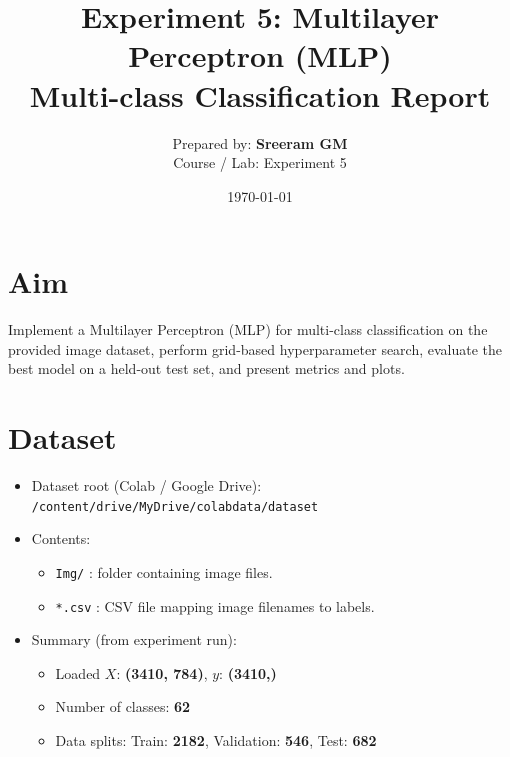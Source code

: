 \documentclass[11pt,a4paper]{article}
\title{Experiment 5: Multilayer Perceptron (MLP) \\ \large Multi-class Classification Report}
\author{Prepared by: \textbf{Sreeram GM} \\
Course / Lab: Experiment 5}
\date{\today}
\begin{document}
\maketitle
\tableofcontents
\bigskip

\section{Aim}
Implement a Multilayer Perceptron (MLP) for multi-class classification on the provided image dataset, perform grid-based hyperparameter search, evaluate the best model on a held-out test set, and present metrics and plots.

\section{Dataset}
\begin{itemize}
  \item Dataset root (Colab / Google Drive): \texttt{/content/drive/MyDrive/colabdata/dataset}
  \item Contents:
    \begin{itemize}
      \item \texttt{Img/} : folder containing image files.
      \item \texttt{*.csv} : CSV file mapping image filenames to labels.
    \end{itemize}
  \item Summary (from experiment run):
    \begin{itemize}
      \item Loaded \(X\): \textbf{(3410, 784)}, \(y\): \textbf{(3410,)}
      \item Number of classes: \textbf{62}
      \item Data splits: Train: \textbf{2182}, Validation: \textbf{546}, Test: \textbf{682}
    \end{itemize}
\end{itemize}
\end{document}
